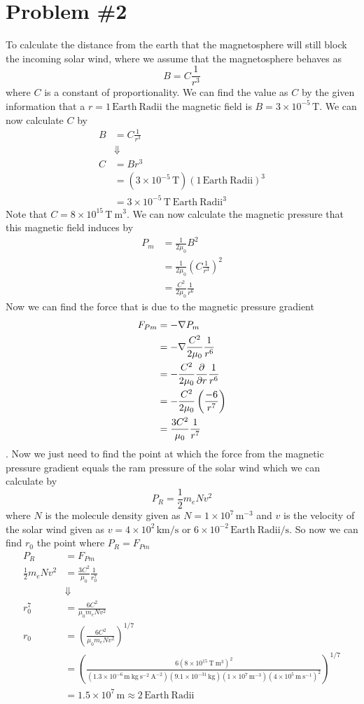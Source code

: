 \documentclass[11pt]{article}
\numberwithin{equation}{section}
\newcommand{\grad}{\bold\nabla}
\newcommand{\unit}[1]{\ensuremath{\, \mathrm{#1}}}
\begin{document}
\section{Problem \#2}
To calculate the distance from the earth that the magnetosphere will still block the incoming solar wind, where we assume that the magnetosphere behaves as
$$B = C\frac{1}{r^3}$$
where $C$ is a constant of proportionality. We can find the value as $C$ by the given information that a $r = 1\unit{Earth\ Radii}$ the magnetic field is $B=3\times10^{-5}\unit{T}$. We can now calculate $C$ by
\begin{align*}
B &= C\frac{1}{r^3}\\
&\Downarrow\\
C &= Br^3\\
&= (3\times10^{-5}\unit{T})(1\unit{Earth\ Radii})^3\\
&= 3\times10^{-5}\unit{T\ Earth\ Radii^3}
\end{align*}
Note that $C = 8\times10^{15}\unit{T\ m^3}$. We can now calculate the magnetic pressure that this magnetic field induces by 
\begin{align*}
P_m &= \frac{1}{2\mu_0}B^2\\
&= \frac{1}{2\mu_0}\left(C\frac{1}{r^3}\right)^2\\
&= \frac{C^2}{2\mu_0}\frac{1}{r^6}
\end{align*}
Now we can find the force that is due to the magnetic pressure gradient
\begin{align*}
F_{Pm} &= -\grad P_m\\
&= -\grad \frac{C^2}{2\mu_0}\frac{1}{r^6}\\
&= -\frac{C^2}{2\mu_0}\frac{\partial}{\partial r} \frac{1}{r^6}\\
&= -\frac{C^2}{2\mu_0}\left(\frac{-6}{r^7}\right)\\
&= \frac{3C^2}{\mu_0}\frac{1}{r^7}\\
\end{align*}
. Now we just need to find the point at which the force from the magnetic pressure gradient equals the ram pressure of the solar wind which we can calculate by 
$$P_R = \frac{1}{2}m_eNv^2$$
where $N$ is the molecule density given as $N = 1\times10^{7}\unit{m^{-3}}$ and $v$ is the velocity of the solar wind given as $v = 4\times10^{2}\unit{km/s}$ or $6\times10^{-2}\unit{Earth\ Radii/s}$. So now we can find $r_0$ the point where $P_R = F_{Pm}$
\begin{align*}
P_R &= F_{Pm}\\
\frac{1}{2}m_eNv^2 &= \frac{3C^2}{\mu_0}\frac{1}{r_0^7}\\
&\Downarrow\\
r_0^7 &= \frac{6C^2}{\mu_0m_eNv^2}\\
r_0 &= \left(\frac{6C^2}{\mu_0m_eNv^2}\right)^{1/7}\\
&= \left(\frac{6(8\times10^{15}\unit{T\ m^3})^2}{(1.3\times10^{-6}\unit{m\ kg\ s^{-2}\ A^{-2}})(9.1\times10^{-31}\unit{kg})(1\times10^{7}\unit{m^{-3}})(4\times10^{5}\unit{m\ s^{-1}})^2}\right)^{1/7}\\
&= 1.5\times10^{7}\unit{m} \approx 2\unit{Earth\ Radii}
\end{align*}
\end{document}
